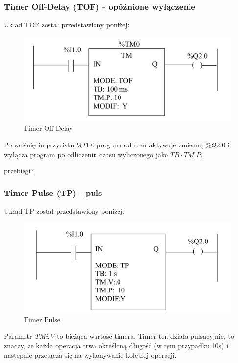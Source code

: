 \documentclass[12pt]{article}
\begin{document}
\subsubsection{Timer Off-Delay (TOF) - opóźnione wyłączenie}

Układ TOF został przedstawiony poniżej:

\begin{figure}[H]
    \centering
    \includegraphics[scale=0.25]{tof.png}
    \caption{Timer Off-Delay}
\end{figure}

Po wciśnięciu przycisku $\%I1.0$ program od razu aktywuje zmienną $\%Q2.0$ i wyłącza program po odliczeniu czasu wyliczonego jako $ TB \cdot TM.P $. 

\colorbox{WildStrawberry}{przebiegi?}

\subsubsection{Timer Pulse (TP) - puls}

Układ TP został przedstawiony poniżej:

\begin{figure}[H]
    \centering
    \includegraphics[scale=0.25]{tp.png}
    \caption{Timer Pulse}
\end{figure}

Parametr \textit{TMi.V} to bieżąca wartość timera. Timer ten działa pulsacyjnie, to znaczy, że każda operacja trwa określoną długość (w tym przypadku 10s) i następnie przełącza się na wykonywanie kolejnej operacji. 
\end{document}
